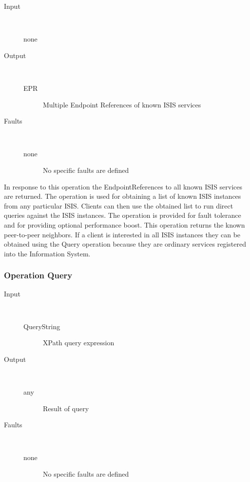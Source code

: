 \documentclass{book}
\begin{document}
\begin{description}

  \item[Input]~\begin{description}
    \item[none]
  \end{description}

  \item[Output]~\begin{description}
    \item[EPR] Multiple Endpoint References of known ISIS services
  \end{description}

  \item[Faults]~\begin{description}
    \item[none]No specific faults are defined
  \end{description}

\end{description}

In response to this operation the EndpointReferences to all known ISIS services are returned. The operation is used for obtaining a list of known ISIS instances from any particular ISIS. Clients can then use the obtained list to run direct queries against the ISIS instances. The operation is provided for fault tolerance and for providing optional performance boost. This operation returns the known peer-to-peer neighbors. If a client is interested in all ISIS instances they can be obtained using the Query operation because they are ordinary services registered into the Information System.

\subsubsection{Operation Query}

\begin{description}

  \item[Input]~\begin{description}
    \item[QueryString] XPath query expression
  \end{description}

  \item[Output]~\begin{description}
    \item[any] Result of query
  \end{description}

  \item[Faults]~\begin{description}
    \item[none]No specific faults are defined
  \end{description}

\end{description}
\end{document}

